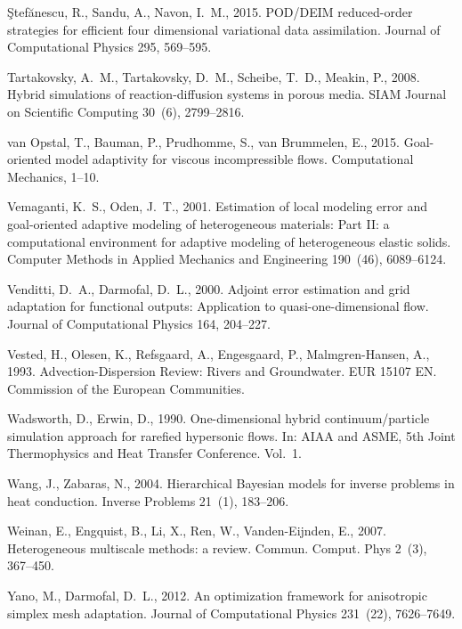 \documentclass[review,sort&compress]{elsarticle}
\theoremstyle{plain} %
\theoremstyle{definition} %
\begin{document}
\begin{thebibliography}{42}
{\c{S}}tef{\u{a}}nescu, R., Sandu, A., Navon, I.~M., 2015. {POD}/{DEIM}
  reduced-order strategies for efficient four dimensional variational data
  assimilation. Journal of Computational Physics 295, 569--595.

Tartakovsky, A.~M., Tartakovsky, D.~M., Scheibe, T.~D., Meakin, P., 2008.
  Hybrid simulations of reaction-diffusion systems in porous media. SIAM
  Journal on Scientific Computing 30~(6), 2799--2816.

van Opstal, T., Bauman, P., Prudhomme, S., van Brummelen, E., 2015.
  Goal-oriented model adaptivity for viscous incompressible flows.
  Computational Mechanics, 1--10.

Vemaganti, K.~S., Oden, J.~T., 2001. Estimation of local modeling error and
  goal-oriented adaptive modeling of heterogeneous materials: {P}art {II}: a
  computational environment for adaptive modeling of heterogeneous elastic
  solids. Computer Methods in Applied Mechanics and Engineering 190~(46),
  6089--6124.

Venditti, D.~A., Darmofal, D.~L., 2000. Adjoint error estimation and grid
  adaptation for functional outputs: Application to quasi-one-dimensional flow.
  Journal of Computational Physics 164, 204--227.

Vested, H., Olesen, K., Refsgaard, A., Engesgaard, P., Malmgren-Hansen, A.,
  1993. Advection-Dispersion Review: Rivers and Groundwater. EUR 15107 EN.
  Commission of the European Communities.

Wadsworth, D., Erwin, D., 1990. One-dimensional hybrid continuum/particle
  simulation approach for rarefied hypersonic flows. In: AIAA and ASME, 5th
  Joint Thermophysics and Heat Transfer Conference. Vol.~1.

Wang, J., Zabaras, N., 2004. Hierarchical {B}ayesian models for inverse
  problems in heat conduction. Inverse Problems 21~(1), 183--206.

Weinan, E., Engquist, B., Li, X., Ren, W., Vanden-Eijnden, E., 2007.
  Heterogeneous multiscale methods: a review. Commun. Comput. Phys 2~(3),
  367--450.

Yano, M., Darmofal, D.~L., 2012. An optimization framework for anisotropic
  simplex mesh adaptation. Journal of Computational Physics 231~(22),
  7626--7649.

\end{thebibliography}
\end{document}
